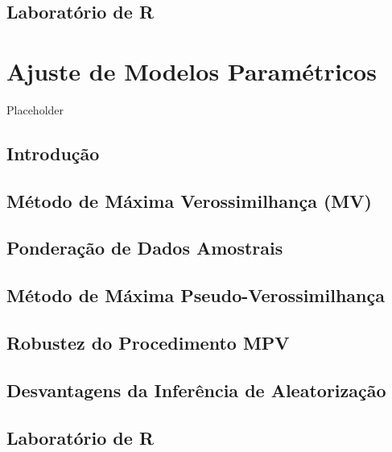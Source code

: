 \documentclass[
]{book}
\begin{document}
\hypertarget{laboratuxf3rio-de-r-1}{%
\section{Laboratório de R}\label{laboratuxf3rio-de-r-1}}

\hypertarget{ajmodpar}{%
\chapter{Ajuste de Modelos Paramétricos}\label{ajmodpar}}

Placeholder

\hypertarget{modpar1}{%
\section{Introdução}\label{modpar1}}

\hypertarget{muxe9todo-de-muxe1xima-verossimilhanuxe7a-mv}{%
\section{Método de Máxima Verossimilhança (MV)}\label{muxe9todo-de-muxe1xima-verossimilhanuxe7a-mv}}

\hypertarget{ponderauxe7uxe3o-de-dados-amostrais}{%
\section{Ponderação de Dados Amostrais}\label{ponderauxe7uxe3o-de-dados-amostrais}}

\hypertarget{modpar3}{%
\section{Método de Máxima Pseudo-Verossimilhança}\label{modpar3}}

\hypertarget{robustez-do-procedimento-mpv}{%
\section{Robustez do Procedimento MPV}\label{robustez-do-procedimento-mpv}}

\hypertarget{desvantagens-da-inferuxeancia-de-aleatorizauxe7uxe3o}{%
\section{Desvantagens da Inferência de Aleatorização}\label{desvantagens-da-inferuxeancia-de-aleatorizauxe7uxe3o}}

\hypertarget{laboratuxf3rio-de-r-2}{%
\section{Laboratório de R}\label{laboratuxf3rio-de-r-2}}
\end{document}

